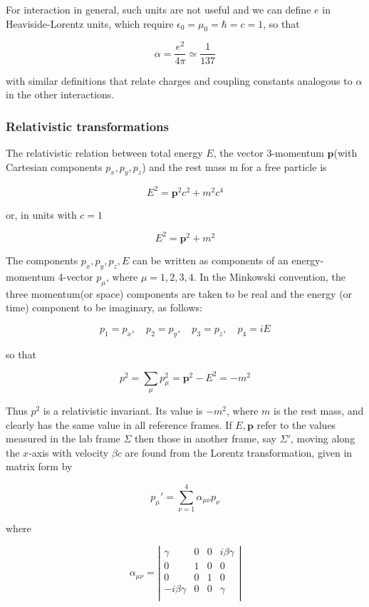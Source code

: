 \documentclass[en, device=normal]{elegantnote}
\begin{document}
For interaction in general, such units are not useful and we can define $e$ in Heaviside-Lorentz 
units, which require $\epsilon_0=\mu_0=\hbar=c=1$, so that

$$\alpha=\frac{e^2}{4\pi}\simeq\frac{1}{137}$$

with similar definitions that relate charges and coupling constants analogous to $\alpha$ in 
the other interactions.

\subsubsection{Relativistic transformations}

The relativistic relation between total energy $E$, the vector 3-momentum $\textbf{p}$(with Cartesian components $p_x,p_y,p_z$) 
and the rest mass m for a free particle is 

$$E^2=\textbf{p}^2c^2+m^2c^4$$

or, in units with $c=1$

$$E^2=\textbf{p}^2+m^2$$

The components $p_x,p_y,p_z,E$ can be written as components of an energy-momentum 4-vector 
$p_\mu$, where $\mu=1,2,3,4$. In the Minkowski convention, the three momentum(or space) components 
are taken to be real and the energy (or time) component to be imaginary, as follows: 

$$p_1=p_x,\quad p_2=p_y,\quad p_3=p_z,\quad p_4=iE$$

so that 

$$p^2=\sum_\mu p^2_\mu=\textbf{p}^2-E^2=-m^2$$

Thus $p^2$ is a relativistic invariant. Its value is $-m^2$, where $m$ is the rest mass, 
and clearly has the same value in all reference frames. If $E,\textbf{p}$ refer to the values measured in the lab 
frame $\Sigma$ then those in another frame, say $\Sigma'$, moving along the $x$-axis with 
velocity $\beta c$ are found from the Lorentz transformation, given in matrix form by 

$$p_\mu'=\sum_{\nu=1}^4\alpha_{\mu\nu}p_\nu$$

where

$$\alpha_{\mu\nu}=
\left\vert
\begin{array}{cccc}
\gamma & 0 & 0 & i\beta\gamma \\
0 & 1 & 0 & 0 \\
0 & 0 & 1 & 0 \\
-i\beta\gamma & 0 & 0 & \gamma \\
\end{array}
\right\vert$$
\end{document}
